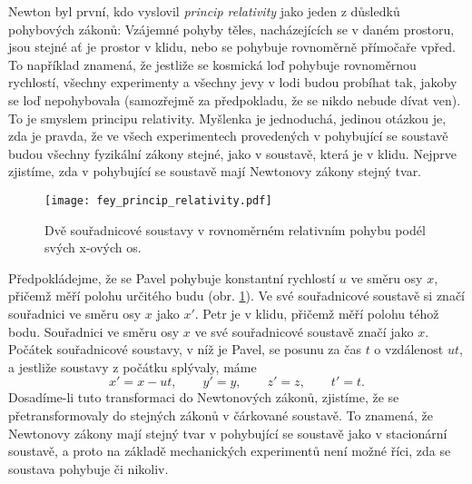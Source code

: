    Newton byl první, kdo vyslovil \emph{princip relativity} jako jeden z důsledků pohybových 
    zákonů: Vzájemné pohyby těles, nacházejících se v daném prostoru, jsou stejné ať je prostor v 
    klidu, nebo se pohybuje rovnoměrně přímočaře vpřed. To například znamená, že jestliže se 
    kosmická loď pohybuje rovnoměrnou rychlostí, všechny experimenty a všechny jevy v lodi budou 
    probíhat tak, jakoby se loď nepohybovala (samozřejmě za předpokladu, že se nikdo nebude dívat 
    ven). To je smyslem principu relativity. Myšlenka je jednoduchá, jedinou otázkou je, zda je 
    pravda, že ve všech experimentech provedených v pohybující se soustavě budou všechny fyzikální 
    zákony stejné, jako v soustavě, která je v klidu. Nejprve zjistíme, zda v pohybující se soustavě 
    mají Newtonovy zákony stejný tvar.        
    
    \begin{figure}
      \centering
      \texttt{[image: fey\_princip\_relativity.pdf]}
      \caption{Dvě souřadnicové soustavy v rovnoměrném relativním pohybu podél svých x-ových os.}
      \label{fyz:fig_fey_spec_relativita}
    \end{figure}
    
    Předpokládejme, že se Pavel pohybuje konstantní rychlostí $u$ ve směru osy $x$, přičemž měří 
    polohu určitého budu (obr. \ref{fyz:fig_fey_spec_relativita}). Ve své souřadnicové soustavě si 
    značí souřadnici ve směru osy $x$ jako $x'$. Petr je v klidu, přičemž měří polohu téhož bodu. 
    Souřadnici ve směru osy $x$ ve své souřadnicové soustavě značí jako $x$. Počátek souřadnicové 
    soustavy, v níž je Pavel, se posunu za čas $t$ o vzdálenost $ut$, a jestliže soustavy z počátku 
    splývaly, máme
    \begin{equation}\label{TEMP:eq_fey_rel_02}
      x' = x - ut, \qquad y' = y, \qquad z' = z, \qquad t' = t. 
    \end{equation}      
    Dosadíme-li tuto transformaci do Newtonových zákonů, zjistíme, že se přetransformovaly do 
    stejných zákonů v čárkované soustavě. To znamená, že Newtonovy zákony mají stejný tvar v 
    pohybující se soustavě jako v stacionární soustavě, a proto na základě mechanických experimentů 
    není možné říci, zda se soustava pohybuje či nikoliv. 
    
